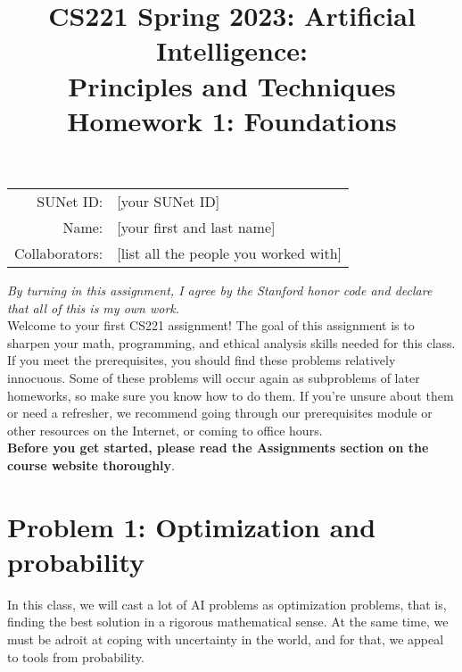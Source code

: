 \documentclass{article}
\title{\textbf{CS221 Spring 2023: Artificial Intelligence:\\ Principles and Techniques} \\Homework 1: Foundations}
\date{}
\theoremstyle{case}
\theoremstyle{definition}
\begin{document}
\maketitle

\begin{center}
\begin{tabular}{rl}
SUNet ID: & [your SUNet ID] \\
Name: & [your first and last name] \\
Collaborators: & [list all the people you worked with]
\end{tabular}
\end{center}

\textit{By turning in this assignment, I agree by the Stanford honor code and declare
that all of this is my own work.} \\

Welcome to your first CS221 assignment! The goal of this assignment is to sharpen your math, programming, and ethical analysis skills needed for this class. If you meet the prerequisites, you should find these problems relatively innocuous. Some of these problems will occur again as subproblems of later homeworks, so make sure you know how to do them. If you're unsure about them or need a refresher, we recommend going through our prerequisites module or other resources on the Internet, or coming to office hours.\\

\textbf{Before you get started, please read the Assignments section on the course website thoroughly}.


\section*{Problem 1: Optimization and probability}

In this class, we will cast a lot of AI problems as optimization problems, that is, finding the best solution in a rigorous mathematical sense.
At the same time, we must be adroit at coping with uncertainty in the world, and for that, we appeal to tools from probability.
\end{document}
